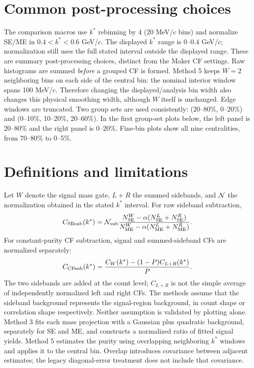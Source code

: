 \documentclass[11pt,a4paper]{article}
\begin{document}
\section{Common post-processing choices}
The comparison macros use $k^*$ rebinning by 4 (20 MeV/$c$ bins) and normalize SE/ME in $0.4<k^*<0.6$ GeV/$c$. The displayed $k^*$ range is $0$--$0.4$ GeV/$c$; normalization still uses the full stated interval outside the displayed range. These are summary post-processing choices, distinct from the Maker CF settings. Raw histograms are summed \emph{before} a grouped CF is formed.
Method 5 keeps $W=2$ neighboring bins on each side of the central bin: the nominal interior window spans 100 MeV/$c$. Therefore changing the displayed/analysis bin width also changes this physical smoothing width, although $W$ itself is unchanged. Edge windows are truncated.
Two group sets are used consistently: (20--80\%, 0--20\%) and (0--10\%, 10--20\%, 20--60\%). In the first group-set plots below, the left panel is 20--80\% and the right panel is 0--20\%. Fine-bin plots show all nine centralities, from 70--80\% to 0--5\%.
\clearpage\section{Definitions and limitations}
Let $W$ denote the signal mass gate, $L+R$ the summed sidebands, and ${\cal N}$ the normalization obtained in the stated $k^*$ interval. For raw sideband subtraction,
\begin{equation}C_{\rm SBsub}(k^*)={\cal N}_{\rm sub}\frac{N_{\rm SE}^{W}-\alpha(N_{\rm SE}^{L}+N_{\rm SE}^{R})}{N_{\rm ME}^{W}-\alpha(N_{\rm ME}^{L}+N_{\rm ME}^{R})}.\end{equation}
For constant-purity CF subtraction, signal and summed-sideband CFs are normalized separately:
\begin{equation}C_{\rm CFsub}(k^*)=\frac{C_W(k^*)-(1-P)C_{L+R}(k^*)}{P}.\end{equation}
The two sidebands are added at the count level; $C_{L+R}$ is not the simple average of independently normalized left and right CFs. The methods assume that the sideband background represents the signal-region background, in count shape or correlation shape respectively. Neither assumption is validated by plotting alone.
Method 3 fits each mass projection with a Gaussian plus quadratic background, separately for SE and ME, and constructs a normalized ratio of fitted signal yields. Method 5 estimates the purity using overlapping neighboring $k^*$ windows and applies it to the central bin. Overlap introduces covariance between adjacent estimates; the legacy diagonal-error treatment does not include that covariance.
\end{document}

